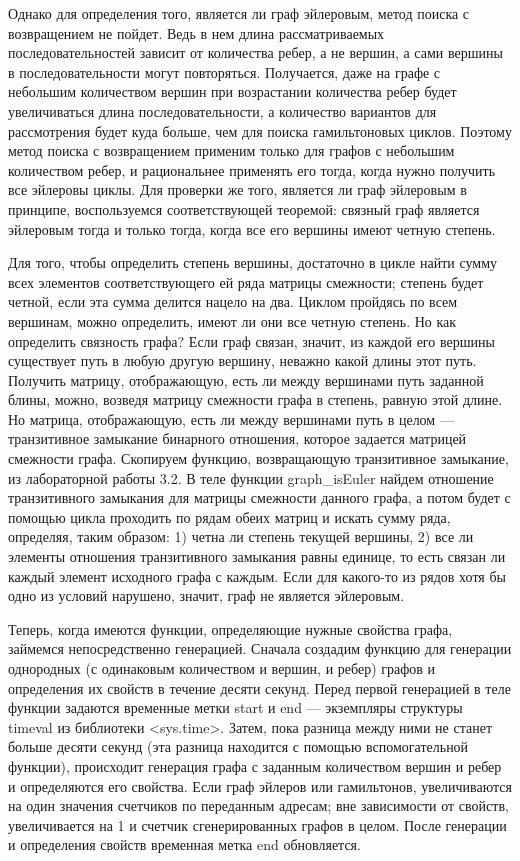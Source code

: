 \documentclass[12pt]{article}
\begin{document}
	 
	
	Однако для определения того, является ли граф эйлеровым, метод поиска с возвращением не пойдет. Ведь в нем длина рассматриваемых последовательностей зависит от  количества ребер, а не вершин, а сами вершины в последовательности могут повторяться. Получается, даже на графе с небольшим количеством вершин при возрастании количества ребер будет увеличиваться длина последовательности, а количество вариантов для рассмотрения будет куда больше, чем для поиска гамильтоновых циклов. Поэтому метод поиска с возвращением применим только для графов с небольшим количеством ребер, и рациональнее применять его тогда, когда нужно получить все эйлеровы циклы. Для проверки же того, является ли граф эйлеровым в принципе, воспользуемся соответствующей теоремой: связный граф является эйлеровым тогда и только тогда, когда все его вершины имеют четную степень.
	
	Для того, чтобы определить степень вершины, достаточно в цикле найти сумму всех элементов соответствующего ей ряда матрицы смежности; степень будет четной, если эта сумма делится нацело на два. Циклом пройдясь по всем вершинам, можно определить, имеют ли они все четную степень. Но как определить связность графа? Если граф связан, значит, из каждой его вершины существует путь в любую другую вершину, неважно какой длины этот путь. Получить матрицу, отображающую, есть ли между вершинами путь заданной блины, можно, возведя матрицу смежности графа в степень, равную этой длине. Но матрица, отображающую, есть ли между вершинами путь в целом --- транзитивное замыкание бинарного отношения, которое задается матрицей смежности графа. Скопируем функцию, возвращающую транзитивное замыкание, из лабораторной работы 3.2. В теле функции graph\_isEuler найдем отношение транзитивного замыкания для матрицы смежности данного графа, а потом будет с помощью цикла проходить по рядам обеих матриц и искать сумму ряда, определяя, таким образом: 1) четна ли степень текущей вершины, 2) все ли элементы отношения транзитивного замыкания равны единице, то есть связан ли каждый элемент исходного графа с каждым. Если для какого-то из рядов хотя бы одно из условий нарушено, значит, граф не является эйлеровым.
	
	 
	
	Теперь, когда имеются функции, определяющие нужные свойства графа, займемся непосредственно генерацией. Сначала создадим функцию для генерации однородных (с одинаковым количеством и вершин, и ребер) графов и определения их свойств в течение десяти секунд. Перед первой генерацией в теле функции задаются временные метки start и end --- экземпляры структуры timeval из библиотеки <sys.time>. Затем, пока разница между ними не станет больше десяти секунд (эта разница находится с помощью вспомогательной функции), происходит генерация графа с заданным количеством вершин и ребер и определяются его свойства. Если граф эйлеров или гамильтонов, увеличиваются на один значения счетчиков по переданным адресам; вне зависимости от свойств, увеличивается на 1 и счетчик сгенерированных графов в целом. После генерации и определения свойств временная метка end обновляется.
	
\end{document}
